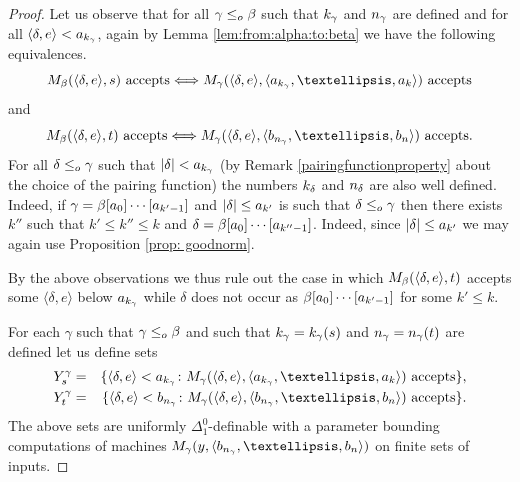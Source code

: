 \documentclass[10pt,a4paper]{amsart}
\def\ifff{\Longleftrightarrow}
\def\la{\langle}
\newcommand{\leqo}{\leq\sb{o}}
\def\ra{\rangle}
\newcommand{\set}[1]{{\{{#1}\}}}
\begin{document}
\begin{proof}
Let us observe that for all $\gamma\leqo\beta$ such that $k\sb\gamma$ and $n\sb\gamma$ are defined and for all $\la\delta,e\ra<a\sb{k\sb\gamma}$, again by Lemma \ref{lem:from:alpha:to:beta} we have the following equivalences.
$$
M\sb\beta(\la\delta,e\ra,s)\mbox{ accepts} \ifff          M\sb\gamma(\la\delta,e\ra,\langle a\sb{k\sb\gamma},\dots, a\sb k \rangle)\mbox{ accepts}
$$
and
$$
M\sb\beta(\la\delta,e\ra,t)\mbox{ accepts}\ifff  M\sb\gamma(\la\delta,e\ra,\langle b\sb{n\sb\gamma},\dots, b\sb n\rangle)\mbox{ accepts}.
$$
For all $\delta \leqo\gamma$ such that $|\delta|< a\sb{k\sb\gamma}$ (by Remark \ref{pairingfunctionproperty} about the choice of the pairing function) the numbers $k\sb\delta$ and $n\sb\delta$ are also well defined. 
Indeed, if $\gamma=\beta[a\sb0]\cdots [a\sb{k'-1}]$ and $|\delta|\leq a\sb{k'}$ is such that $\delta\leqo\gamma$ then there exists $k''$ such that $k'\leq k''\leq k$ and $\delta=\beta[a\sb0]\cdots [a\sb{k''-1}]$. 
Indeed, since $|\delta|\leq a\sb{k'}$  we may again use Proposition \ref{prop: goodnorm}.

By the above observations we thus rule out the case in which $M\sb\beta(\la \delta,e \ra,t)$ accepts some $\la\delta,e\ra$ below $a\sb{k\sb\gamma}$ while $\delta$ does not occur as $\beta [a\sb0]\cdots [a\sb{k'-1}]$ for some $k'\leq k$.

For each $\gamma$ such that $\gamma \leqo\beta$ and such that $k\sb\gamma=k\sb\gamma(s)$ and $n\sb\gamma=n\sb\gamma(t)$ are defined let us define sets
\begin{eqnarray*}
Y\sp {\gamma}\sb{s}&=&
\set{\la\delta,e\ra<a\sb{k\sb\gamma}\colon M\sb\gamma(\la\delta,e\ra,\langle a\sb{k\sb\gamma},\dots,a\sb k\rangle)\mbox{ accepts}},\\
Y\sp{\gamma}\sb{t}&=&      \set{\la\delta,e\ra<b\sb{n\sb\gamma }\colon M\sb\gamma(\la\delta,e\ra,\langle b\sb{n\sb\gamma},\dots,b\sb n\rangle)\mbox{ accepts}}.
\end{eqnarray*}
The above sets are uniformly $\Delta^0_1$-definable with a parameter bounding computations of machines $M\sb\gamma (y,\langle b\sb{n\sb\gamma},\dots,b\sb n\rangle)$ on finite sets of inputs.


\end{proof}
\end{document}
